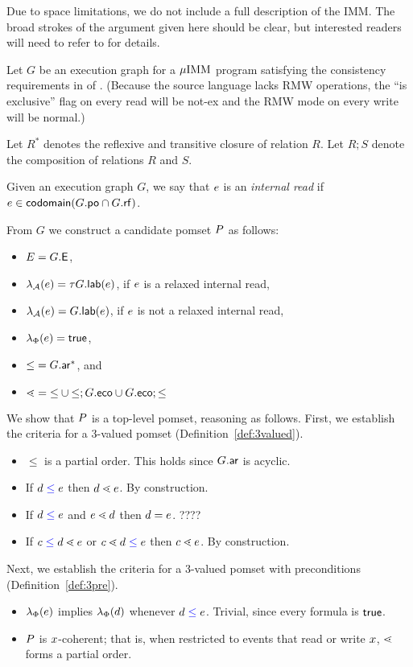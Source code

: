 Due to space limitations, we do not include a full description of the IMM.
The broad strokes of the argument given here should be clear, but interested
readers will need to refer to \citep{DBLP:journals/pacmpl/PodkopaevLV19} for
details.

Let $G$ be an execution graph for a $\mu\text{IMM}$ program satisfying the
consistency requirements in  of
\citep{DBLP:journals/pacmpl/PodkopaevLV19}. (Because the source language
lacks RMW operations, the ``is exclusive'' flag on every read will be
\textsf{not-ex} and the RMW mode on every write will be \textsf{normal}.)

Let $R^*$ denotes the reflexive and transitive closure of relation $R$.  Let
$R;S$ denote the composition of relations $R$ and $S$.

Given an execution graph $G$, we say that $e$ is an \emph{internal read} if
$e\in\mathsf{codomain}(G.\mathsf{po}\cap G.\mathsf{rf})$.

From $G$ we construct a candidate pomset $P$ as follows:
\begin{itemize}
\item $E= G.\textsf{E}$,
\item $\lambda_{\mathcal{A}}(e)=\tau G.\mathsf{lab}(e)$, if $e$ is a relaxed
  internal read, 
\item $\lambda_{\mathcal{A}}(e)=G.\mathsf{lab}(e)$, if $e$ is not a relaxed
  internal read,
\item $\lambda_{\Phi}(e)=\mathsf{true}$,
\item ${\leq} = G.{\mathrel{\mathsf{ar}}}^*$, and
\item ${\lessdot} = {\leq} \cup {\leq}; {G.{\mathrel{\mathsf{eco}}}} \cup {G.{\ensuremath{\mathrel{\mathsf{eco}}}}} ; {\leq}$
\end{itemize}

We show that $P$ is a top-level pomset, reasoning as follows.
First, we establish the criteria for a 3-valued pomset (Definition~\ref{def:3valued}).
\begin{itemize}
\item ${\le}$ is a partial order.  This holds since $G.{\mathrel{\mathsf{ar}}}$ is acyclic.
\item If $d \mathrel{{\color{blue}\leq}} e$ then $d \lessdot e$.  By construction.
\item If $d \mathrel{{\color{blue}\leq}} e$ and $e \lessdot d$ then $d = e$.  ????
\item If $c \mathrel{{\color{blue}\leq}} d \lessdot e$ or $c \lessdot d \mathrel{{\color{blue}\leq}} e$ then
  $c \lessdot e$. By construction.
\end{itemize}

Next, we establish the criteria for a 3-valued pomset with preconditions (Definition~\ref{def:3pre}).
\begin{itemize}
\item $\lambda_{\Phi}(e)$ implies $\lambda_{\Phi}(d)$ whenever
  $d\mathrel{{\color{blue}\leq}}e$.   Trivial, since every formula is $\mathsf{true}$.
\item $P$ is $x$-coherent; that is, when restricted to events that
  read or write $x$, $\lessdot$ forms a partial order.
\end{itemize}

